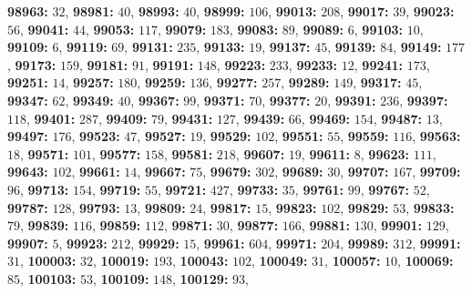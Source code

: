 \textsf{\bfseries 98963:} $32$, \textsf{\bfseries 98981:} $40$, \textsf{\bfseries 98993:} $40$, \textsf{\bfseries 98999:} $106$, \textsf{\bfseries 99013:} $208$, \textsf{\bfseries 99017:} $39$, \textsf{\bfseries 99023:} $56$, \textsf{\bfseries 99041:} $44$, \textsf{\bfseries 99053:} $117$, \textsf{\bfseries 99079:} $183$, \textsf{\bfseries 99083:} $89$, \textsf{\bfseries 99089:} $6$, \textsf{\bfseries 99103:} $10$, \textsf{\bfseries 99109:} $6$, \textsf{\bfseries 99119:} $69$, \textsf{\bfseries 99131:} $235$, \textsf{\bfseries 99133:} $19$, \textsf{\bfseries 99137:} $45$, \textsf{\bfseries 99139:} $84$, \textsf{\bfseries 99149:} $177$, \textsf{\bfseries 99173:} $159$, \textsf{\bfseries 99181:} $91$, \textsf{\bfseries 99191:} $148$, \textsf{\bfseries 99223:} $233$, \textsf{\bfseries 99233:} $12$, \textsf{\bfseries 99241:} $173$, \textsf{\bfseries 99251:} $14$, \textsf{\bfseries 99257:} $180$, \textsf{\bfseries 99259:} $136$, \textsf{\bfseries 99277:} $257$, \textsf{\bfseries 99289:} $149$, \textsf{\bfseries 99317:} $45$, \textsf{\bfseries 99347:} $62$, \textsf{\bfseries 99349:} $40$, \textsf{\bfseries 99367:} $99$, \textsf{\bfseries 99371:} $70$, \textsf{\bfseries 99377:} $20$, \textsf{\bfseries 99391:} $236$, \textsf{\bfseries 99397:} $118$, \textsf{\bfseries 99401:} $287$, \textsf{\bfseries 99409:} $79$, \textsf{\bfseries 99431:} $127$, \textsf{\bfseries 99439:} $66$, \textsf{\bfseries 99469:} $154$, \textsf{\bfseries 99487:} $13$, \textsf{\bfseries 99497:} $176$, \textsf{\bfseries 99523:} $47$, \textsf{\bfseries 99527:} $19$, \textsf{\bfseries 99529:} $102$, \textsf{\bfseries 99551:} $55$, \textsf{\bfseries 99559:} $116$, \textsf{\bfseries 99563:} $18$, \textsf{\bfseries 99571:} $101$, \textsf{\bfseries 99577:} $158$, \textsf{\bfseries 99581:} $218$, \textsf{\bfseries 99607:} $19$, \textsf{\bfseries 99611:} $8$, \textsf{\bfseries 99623:} $111$, \textsf{\bfseries 99643:} $102$, \textsf{\bfseries 99661:} $14$, \textsf{\bfseries 99667:} $75$, \textsf{\bfseries 99679:} $302$, \textsf{\bfseries 99689:} $30$, \textsf{\bfseries 99707:} $167$, \textsf{\bfseries 99709:} $96$, \textsf{\bfseries 99713:} $154$, \textsf{\bfseries 99719:} $55$, \textsf{\bfseries 99721:} $427$, \textsf{\bfseries 99733:} $35$, \textsf{\bfseries 99761:} $99$, \textsf{\bfseries 99767:} $52$, \textsf{\bfseries 99787:} $128$, \textsf{\bfseries 99793:} $13$, \textsf{\bfseries 99809:} $24$, \textsf{\bfseries 99817:} $15$, \textsf{\bfseries 99823:} $102$, \textsf{\bfseries 99829:} $53$, \textsf{\bfseries 99833:} $79$, \textsf{\bfseries 99839:} $116$, \textsf{\bfseries 99859:} $112$, \textsf{\bfseries 99871:} $30$, \textsf{\bfseries 99877:} $166$, \textsf{\bfseries 99881:} $130$, \textsf{\bfseries 99901:} $129$, \textsf{\bfseries 99907:} $5$, \textsf{\bfseries 99923:} $212$, \textsf{\bfseries 99929:} $15$, \textsf{\bfseries 99961:} $604$, \textsf{\bfseries 99971:} $204$, \textsf{\bfseries 99989:} $312$, \textsf{\bfseries 99991:} $31$, \textsf{\bfseries 100003:} $32$, \textsf{\bfseries 100019:} $193$, \textsf{\bfseries 100043:} $102$, \textsf{\bfseries 100049:} $31$, \textsf{\bfseries 100057:} $10$, \textsf{\bfseries 100069:} $85$, \textsf{\bfseries 100103:} $53$, \textsf{\bfseries 100109:} $148$, \textsf{\bfseries 100129:} $93$, 
